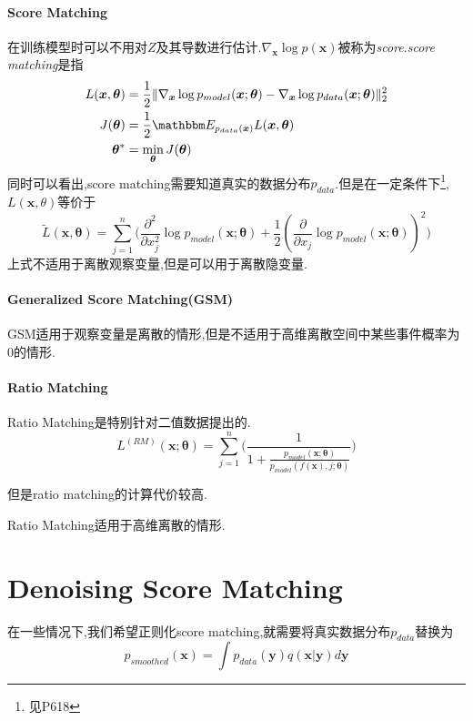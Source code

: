 \paragraph{Score Matching}在训练模型时可以不用对$Z$及其导数进行估计.$\nabla_{\bm x}\log p(\bm x)$被称为\textit{score}.\textit{score matching}是指
\begin{equation}\begin{split}
L(\bm x,\bm\theta)&=\frac{1}{2}\|\nabla_{\bm x}\log p_{model}(\bm x;\bm\theta)-\nabla_{\bm x}\log p_{data}(\bm x;\bm\theta)\|_2^2\\
J(\bm\theta)&=\frac{1}{2}\mathbbm E_{p_{data}(\bm x)}L(\bm x,\bm\theta)\\
{\bm\theta}^\ast&=\min_{\bm\theta} J(\bm\theta)
\end{split}\end{equation}
同时可以看出,score matching需要知道真实的数据分布$p_{data}$.但是在一定条件下\footnote{见P618},$L(\bm x,\theta)$等价于
\begin{equation}
\tilde L(\bm x,\bm\theta)=\sum_{j=1}^n\Big(\frac{\partial^2}{\partial x_j^2}\log p_{model}(\bm x;\bm\theta)+\frac{1}{2}(\frac{\partial}{\partial x_j}\log p_{model}(\bm x;\bm\theta))^2\Big)
\end{equation}
上式不适用于离散观察变量,但是可以用于离散隐变量.

\paragraph{Generalized Score Matching(GSM)}GSM适用于观察变量是离散的情形,但是不适用于高维离散空间中某些事件概率为$0$的情形.

\paragraph{Ratio Matching} Ratio Matching是特别针对二值数据提出的.
\begin{equation}
L^{(RM)}(\bm x;\bm\theta)=\sum_{j=1}^n\Big(\frac{1}{1+\frac{p_{model}(\bm x;\bm\theta)}{p_{model}(f(\bm x), j;\bm\theta)}}\Big)
\end{equation}

但是ratio matching的计算代价较高.

Ratio Matching适用于高维离散的情形.

\section{Denoising Score Matching}

在一些情况下,我们希望正则化score matching,就需要将真实数据分布$p_{data}$替换为
\begin{equation}
p_{smoothed}(\bm x)=\int p_{data}(\bm y)q(\bm x|\bm y)d\bm y
\end{equation}

